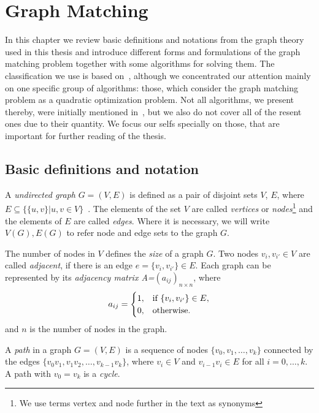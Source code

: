 
\chapter{Graph Matching}

In this chapter we review basic definitions and notations from the graph theory used in this thesis and introduce different forms and formulations of the graph matching problem together with some algorithms for solving them. The classification we use is based on~\cite{Conte2004}, although we concentrated our attention mainly on one specific group of algorithms: those, which consider the graph matching problem as a quadratic optimization problem. Not all algorithms, we present thereby, were initially mentioned in~\cite{Conte2004}, but we also do not cover all of the resent ones due to their quantity. We focus our selfs specially on those, that are important for further reading of the thesis.

\section{Basic definitions and notation}
A \emph{undirected graph} $G=(V,E)$ is defined as a pair of disjoint sets $V$, $E$, where $E\subseteq\{\{u,v\}| u, v\in V\}$~\cite{Diestel2000}. The elements of the set $V$ are called \emph{vertices} or \emph{nodes}\footnote{We use terms vertex and node further in the text as synonyms} and the elements of $E$ are called \emph{edges}. Where it is necessary, we will write $V(G), E(G)$ to refer node and edge sets to the graph $G$.

The number of nodes in $V$ defines the \emph{size} of a graph $G$.
Two nodes $v_{i},v_{i'}\in V$ are called \emph{adjacent}, if there is an edge $e=\{v_{i},v_{i'}\}\in E$. Each graph can be represented by its \emph{adjacency matrix A=$(a_{ij})_{n\times n}$}, where 
\begin{equation*}\centering
a_{ij}=\begin{cases}
 1, & \text{if } \{v_{i},v_{i'}\}\in E, \\
 0, & \text{otherwise.} \\
\end{cases}
\end{equation*}
and $n$ is the number of nodes in the graph.

A \emph{path} in a graph $G=(V,E)$ is a sequence of nodes $\{v_0,v_1,\dots,v_k\}$ connected by the edges $\{v_0v_1,v_1v_2,\dots,v_{k-1}v_k\}$, where $v_i\in V$ and $v_{i-1}v_i\in E$ for all $i=0,\dots,k$. A path with $v_0=v_k$ is a \emph{cycle}.

